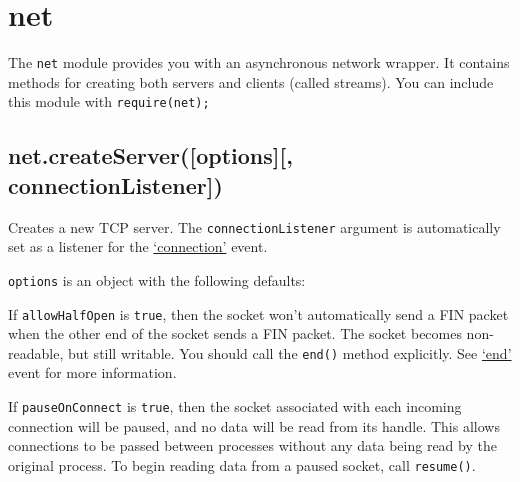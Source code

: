 \section{net}\label{net}

\begin{Shaded}
\begin{Highlighting}[]
 
\end{Highlighting}
\end{Shaded}

The \texttt{net} module provides you with an asynchronous network
wrapper. It contains methods for creating both servers and clients
(called streams). You can include this module with
\texttt{require(\textquotesingle{}net\textquotesingle{});}

\subsection{net.createServer({[}options{]}{[},
connectionListener{]})}\label{net.createserveroptions-connectionlistener}

Creates a new TCP server. The \texttt{connectionListener} argument is
automatically set as a listener for the
\hyperref[netux5feventux5fconnection]{`connection'} event.

\texttt{options} is an object with the following defaults:

\begin{Shaded}
\begin{Highlighting}[]
\NormalTok{\{}
  \NormalTok{: }\NormalTok{,}
  \NormalTok{: }
\NormalTok{\}}
\end{Highlighting}
\end{Shaded}

If \texttt{allowHalfOpen} is \texttt{true}, then the socket won't
automatically send a FIN packet when the other end of the socket sends a
FIN packet. The socket becomes non-readable, but still writable. You
should call the \texttt{end()} method explicitly. See
\hyperref[netux5feventux5fend]{`end'} event for more information.

If \texttt{pauseOnConnect} is \texttt{true}, then the socket associated
with each incoming connection will be paused, and no data will be read
from its handle. This allows connections to be passed between processes
without any data being read by the original process. To begin reading
data from a paused socket, call \texttt{resume()}.

